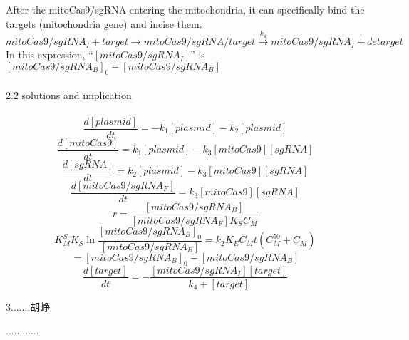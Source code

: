 \documentclass[a4paper,10pt]{article}
\begin{document}
	After the mitoCas9/sgRNA entering the mitochondria, it can specifically bind the targets (mitochondria gene) and incise them.
	\begin{displaymath}
	mitoCas9/sgRNA_I+target\longrightarrow mitoCas9/sgRNA/target\stackrel{k_4} {\longrightarrow} mitoCas9/sgRNA_I+detarget
	\end{displaymath}
	In this expression, “$[mitoCas9/sgRNA_I]$” is $ [mitoCas9/sgRNA_B]_0-[mitoCas9/sgRNA_B]$ 
	\\\\
	{\Large 2.2 solutions and implication} 
	\\\\
	\begin{equation}
\frac{d[plasmid]}{dt}=-k_1[plasmid]-k_2[plasmid]\tag{1}
	\end{equation}
	\begin{equation}
	\frac{d[mitoCas9]}{dt}=k_1[plasmid]-k_3[mitoCas9][sgRNA]\tag{2}
	\end{equation}
	\begin{equation}
	\frac{d[sgRNA]}{dt}=k_2[plasmid]-k_3[mitoCas9][sgRNA]\tag{3}
	\end{equation}
	\begin{equation}
	\frac{d[mitoCas9/sgRNA_F]}{dt}=k_3[mitoCas9][sgRNA]\tag{4}
	\end{equation}
	\begin{equation}
    r=\frac{[mitoCas9/sgRNA_B]}{[mitoCas9/sgRNA_F]K_S C_M}\tag{5}
	\end{equation}
	\begin{equation}
	K_M^SK_S\ln\frac{[mitoCas9/sgRNA_B]_0}{[mitoCas9/sgRNA_B]}=k_2K_EC_Mt (C_M^{50}+C_M)\tag{6}
	\end{equation}
	\begin{equation}
    [mitoCas9/sgRNA_I]= [mitoCas9/sgRNA_B]_0-[mitoCas9/sgRNA_B]\tag{7}
	\end{equation}
	\begin{equation}
	\frac{d[target]}{dt}=-\frac{[mitoCas9/sgRNA_I][target]}{k_4+[target]}\tag{8}
	\end{equation}
	\begin{center}
	{\Large 3.......胡峥}
	\end{center}
............
\end{document}
